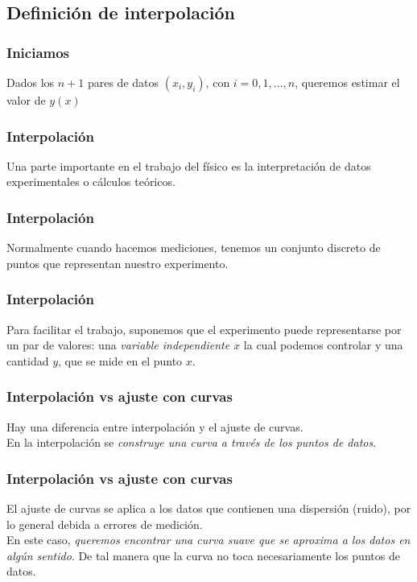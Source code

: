 \subsection{Definición de interpolación}
\begin{frame}
\frametitle{Iniciamos}
Dados los $n+1$ pares de datos $(x_{i},y_{i})$, con $i=0,1,\ldots,n$, queremos estimar el valor de $y(x)$
\end{frame}
\begin{frame}
\frametitle{Interpolación}
Una parte importante en el trabajo del físico es la interpretación de datos experimentales o cálculos teóricos.
\end{frame}
\begin{frame}
\frametitle{Interpolación}
Normalmente cuando hacemos mediciones, tenemos un conjunto discreto de puntos que representan nuestro experimento.
\end{frame}
\begin{frame}
\frametitle{Interpolación}
Para facilitar el trabajo, suponemos que el experimento puede representarse por un par de valores: una \textit{variable independiente $x$} la cual podemos controlar y una cantidad $y$, que se mide en el punto $x$.
\end{frame}
\begin{frame}
\frametitle{Interpolación vs ajuste con curvas}
Hay una diferencia entre interpolación y el ajuste de curvas.
\\
\bigskip
En la interpolación se \emph{construye una curva a través de los puntos de datos}.
\end{frame}
\begin{frame}
\frametitle{Interpolación vs ajuste con curvas}
El ajuste de curvas se aplica a los datos que contienen una dispersión (ruido), por lo general debida a errores de medición.
\\
\bigskip
En este caso, \emph{queremos encontrar una curva suave que se aproxima a los datos en algún sentido}. De tal manera que la curva no toca necesariamente los puntos de datos.
\end{frame}
